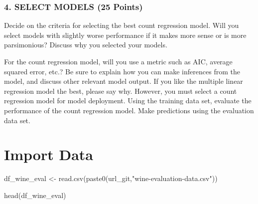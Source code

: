 \documentclass[
]{article}
\newenvironment{Shaded}{\begin{snugshade}}{\end{snugshade}}
\newcommand{\FunctionTok}[1]{\textcolor[rgb]{0.00,0.00,0.00}{#1}}
\newcommand{\NormalTok}[1]{#1}
\newcommand{\OtherTok}[1]{\textcolor[rgb]{0.56,0.35,0.01}{#1}}
\newcommand{\StringTok}[1]{\textcolor[rgb]{0.31,0.60,0.02}{#1}}
\begin{document}
\hypertarget{select-models-25-points}{%
\subsubsection{4. SELECT MODELS (25
Points)}\label{select-models-25-points}}

Decide on the criteria for selecting the best count regression model.
Will you select models with slightly worse performance if it makes more
sense or is more parsimonious? Discuss why you selected your models.

For the count regression model, will you use a metric such as AIC,
average squared error, etc.? Be sure to explain how you can make
inferences from the model, and discuss other relevant model output. If
you like the multiple linear regression model the best, please say why.
However, you must select a count regression model for model deployment.
Using the training data set, evaluate the performance of the count
regression model. Make predictions using the evaluation data set.

\newpage

\hypertarget{import-data}{%
\section{Import Data}\label{import-data}}

\begin{Shaded}
\begin{Highlighting}[]
\NormalTok{df\_wine\_eval }\OtherTok{\textless{}{-}} 
  \FunctionTok{read.csv}\NormalTok{(}\FunctionTok{paste0}\NormalTok{(url\_git,}\StringTok{"wine{-}evaluation{-}data.csv"}\NormalTok{))}

\FunctionTok{head}\NormalTok{(df\_wine\_eval)}
\end{Highlighting}
\end{Shaded}
\end{document}
